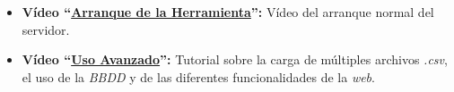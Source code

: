 \begin{itemize}
    \item \textbf{Vídeo ``\href{https://youtu.be/Yd4iXeUheLM}{Arranque de la Herramienta}'':} Vídeo del arranque normal del servidor.
    \item \textbf{Vídeo ``\href{https://youtu.be/rqjkfDiCUp4}{Uso Avanzado}'':} Tutorial sobre la carga de múltiples archivos \textit{.csv}, el uso de la \textit{BBDD} y de las diferentes funcionalidades de la \textit{web}.
\end{itemize}



    
     